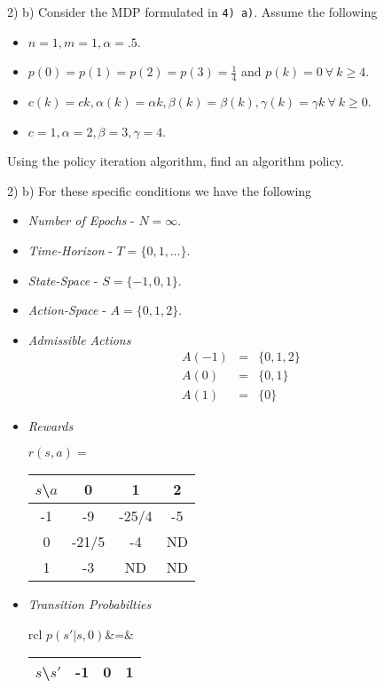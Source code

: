 \documentclass[11pt,a4paper]{article}
\begin{document}
\begin{question}{2) b)}
  Consider the MDP formulated in \texttt{4) a)}. Assume the following
  \begin{itemize}
    \item $n=1,m=1,\alpha=.5$.
    \item $p(0)=p(1)=p(2)=p(3)=\frac14$ and $p(k)=0\ \forall\ k\geq4$.
    \item $c(k)=ck,\alpha(k)=\alpha k,\beta(k)=\beta(k),\gamma(k)=\gamma k\ \forall\ k\geq 0$.
    \item $c=1,\alpha=2,\beta=3,\gamma=4$.
  \end{itemize}
  Using the policy iteration algorithm, find an algorithm policy.
\end{question}

\begin{answer}{2) b)}
  For these specific conditions we have the following
  \begin{itemize}
    \item \textit{Number of Epochs} - $N=\infty$.
    \item \textit{Time-Horizon} - $T=\{0,1,\dots\}$.
    \item \textit{State-Space} - $S=\{-1,0,1\}$.
    \item \textit{Action-Space} - $A=\{0,1,2\}$.
    \item \textit{Admissible Actions}
    \[\begin{array}{rcl}
      A(-1)&=&\{0,1,2\}\\
      A(0)&=&\{0,1\}\\
      A(1)&=&\{0\}
    \end{array}\]
    \item \textit{Rewards}
    \begin{center}$r(s,a)=$
      \begin{tabular}{c|ccc}
        $s$\textbackslash$a$&0&1&2\\\hline
        -1&-9&-25/4&-5\\
        0&-21/5&-4&ND\\
        1&-3&ND&ND
      \end{tabular}
    \end{center}
    \item \textit{Transition Probabilties}
    \begin{center}
      \begin{tabular}{rcl}
        $p(s'|s,0)$&=&
        \begin{tabular}{c|ccc}
          $s$\textbackslash$s'$&-1&0&1\\\hline

\end{tabular}
\end{tabular}
\end{center}
\end{itemize}
\end{answer}
\end{document}
